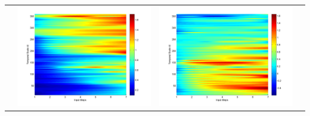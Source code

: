 \documentclass[11pt]{article}
\begin{document}
\begin{table}[H]
{\begin{tabular}{cccc}
&\begin{minipage}{.3\textwidth}\includegraphics[width=\linewidth]{resultgraph/05585000p.png}\end{minipage}
&\begin{minipage}{.3\textwidth}\includegraphics[width=\linewidth]{resultgraph/05585000diff_ep.png}\end{minipage}

\end{tabular}}
\end{table}
\end{document}
